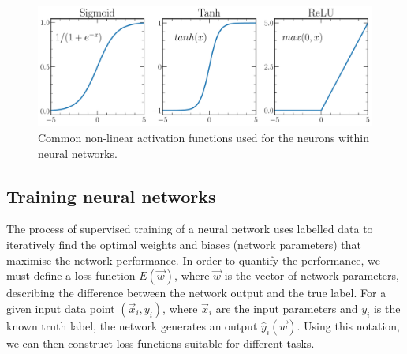 \begin{figure} %
    \includegraphics[width=\textwidth]{diagrams/6-cvn/activations.pdf}
    \caption[Common non-linear activation functions.]
    {Common non-linear activation functions used for the neurons within neural networks.}
    \label{fig:activations}
\end{figure}

\subsection{Training neural networks} %
\label{sec:cvn_theory_training} %

The process of supervised training of a neural network uses labelled data to iteratively find the
optimal weights and biases (network parameters) that maximise the network performance. In order to
quantify the performance, we must define a loss function $E(\vec{w})$, where $\vec{w}$ is the
vector of network parameters, describing the difference between the network output and the true
label. For a given input data point $(\vec{x}_{i}, y_{i})$, where $\vec{x}_{i}$ are the input
parameters and $y_{i}$ is the known truth label, the network generates an output
$\hat{y}_{i}(\vec{w})$. Using this notation, we can then construct loss functions suitable for
different tasks.

